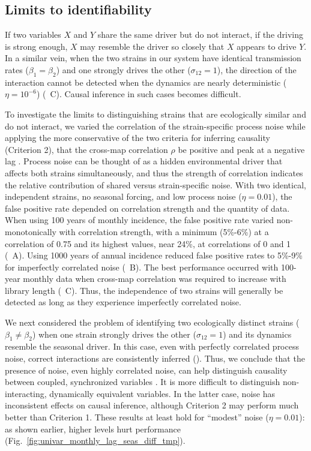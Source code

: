 \documentclass[10pt,letterpaper]{article}
\begin{document}
\subsection*{Limits to identifiability}

If two variables $X$ and $Y$ share the same driver but do not interact, if the driving is strong enough, $X$ may resemble the driver so closely that $X$ appears to drive $Y$.
In a similar vein, when the two strains in our system have identical transmission rates ($\beta_1= \beta_2$) and one strongly drives the other ($\sigma_{12}=1$), the direction of the interaction cannot be detected when the dynamics are nearly deterministic ($\eta=10^{-6}$) (~C). 
Causal inference in such cases becomes difficult.

To investigate the limits to distinguishing strains that are ecologically similar and do not interact, we varied the correlation of the strain-specific process noise while applying the more conservative of the two criteria for inferring causality (Criterion 2), that the cross-map correlation $\rho$ be positive and peak at a negative lag \cite{Ye2015}.
Process noise can be thought of as a hidden environmental driver that affects both strains simultaneously, and thus the strength of correlation indicates the relative contribution of shared versus strain-specific noise.  
With two identical, independent strains, no seasonal forcing, and low process noise ($\eta=0.01$), the false positive rate depended on correlation strength and the quantity of data.
When using 100 years of monthly incidence, the false positive rate varied non-monotonically with correlation strength, with a minimum (5\%-6\%) at a correlation of 0.75 and its highest values, near 24\%, at correlations of 0 and 1 (~A).
Using 1000 years of annual incidence reduced false positive rates to 5\%-9\% for imperfectly correlated noise (~B).
The best performance occurred with 100-year monthly data when cross-map correlation was required to increase with library length (~C).
Thus, the independence of two strains will generally be detected as long as they experience imperfectly correlated noise. 

We next considered the problem of identifying two ecologically distinct strains ($\beta_1 \neq \beta_2$) when one strain strongly drives the other ($\sigma_{12}=1$) and its dynamics resemble the seasonal driver.
In this case, even with perfectly correlated process noise, correct interactions are consistently inferred ().
Thus, we conclude that the presence of noise, even highly correlated noise, can help distinguish causality between coupled, synchronized variables \cite{Schumacher2015}.
It is more difficult to distinguish non-interacting, dynamically equivalent variables.
In the latter case, noise has inconsistent effects on causal inference, although Criterion 2 may perform much better than Criterion 1.
These results at least hold for ``modest'' noise ($\eta=0.01$): as shown earlier, higher levels hurt performance (Fig.~\ref{fig:univar_monthly_lag_seas_diff_tmp}).
\end{document}
